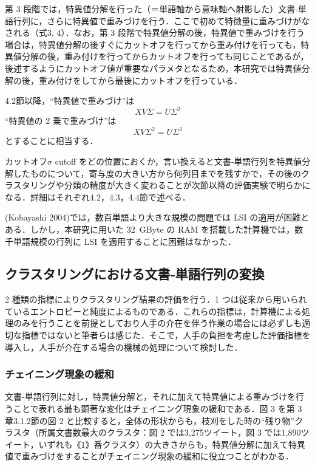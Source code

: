 \documentclass[japanese]{jnlp_1.4}
\begin{document}
第 3 段階では，特異値分解を行った（＝単語軸から意味軸へ射影した）文書‐単語行列に，さらに特異値で重みづけを行う．ここで初めて特徴量に重みづけがなされる（式3, 4）．なお，第 3 段階で特異値分解の後，特異値で重みづけを行う場合は，特異値分解の後すぐにカットオフを行ってから重み付けを行っても，特異値分解の後，重み付けを行ってからカットオフを行っても同じことであるが，後述するようにカットオフ値が重要なパラメタとなるため，本研究では特異値分解の後，重み付けをしてから最後にカットオフを行っている．

4.2節以降，``特異値で重みづけ''は
\begin{equation}
 XV\Sigma =U\Sigma^{2}
	
\end{equation}
``特異値の 2 乗で重みづけ''は
\begin{equation}
 XV\Sigma^{2}=U\Sigma^{3}
	
\end{equation}
とすることに相当する．

カットオフ$\sigma$ cutoff をどの位置におくか，言い換えると文書‐単語行列を特異値分解したものについて，寄与度の大きい方から何列目までを残すかで，その後のクラスタリングや分類の精度が大きく変わることが次節以降の評価実験で明らかになる．詳細はそれぞれ4.2，4.3，4.4節で述べる．

 (Kobayashi 2004)では，数百単語より大きな規模の問題では LSI の適用が困難とある．しかし，本研究に用いた 32~GByte の RAM を搭載した計算機では，数千単語規模の行列に LSI を適用することに困難はなかった．


\subsection{クラスタリングにおける文書‐単語行列の変換}

2 種類の指標によりクラスタリング結果の評価を行う．1 つは従来から用いられているエントロピーと純度によるものである．これらの指標は，計算機による処理のみを行うことを前提としており人手の介在を伴う作業の場合には必ずしも適切な指標ではないと筆者らは感じた．そこで，人手の負担を考慮した評価指標を導入し，人手が介在する場合の機械の処理について検討した．


\subsubsection{チェイニング現象の緩和}

文書‐単語行列に対し，特異値分解と，それに加えて特異値による重みづけを行うことで表れる最も顕著な変化はチェイニング現象の緩和である．図 3 を第 3 章3.1.2節の図 2 と比較すると，全体の形状からも，枝刈をした時の``残り物''クラスタ（所属文書数最大のクラスタ：図 2 では3,275ツイート，図 3 では1,890ツイート，いずれも《1》番クラスタ）の大きさからも，特異値分解に加えて特異値で重みづけをすることがチェイニング現象の緩和に役立つことがわかる．
\end{document}
